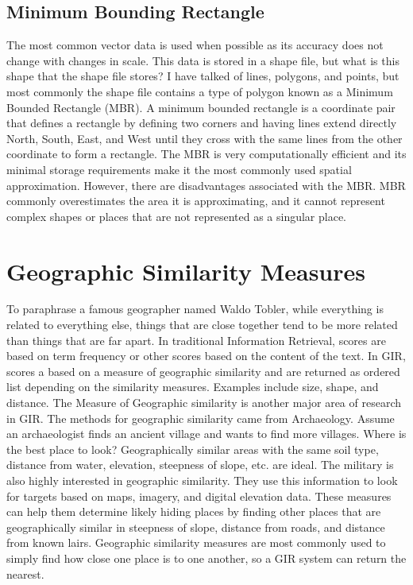 \documentclass[10pt, conference, compsocconf]{IEEEtran}
\begin{document}
\subsection{Minimum Bounding Rectangle}
The most common vector data is used when possible as its accuracy does not change with changes in scale. This data is stored in a shape file, but what is this shape that the shape file stores? I have talked of lines, polygons, and points, but most commonly the shape file contains a type of polygon known as a Minimum Bounded Rectangle (MBR). A minimum bounded rectangle is a coordinate pair that defines a rectangle by defining two corners and having lines extend directly North, South, East, and West until they cross with the same lines from the other coordinate to form a rectangle. The MBR is very computationally efficient and its minimal storage requirements make it the most commonly used spatial approximation. However, there are disadvantages associated with the MBR. MBR commonly overestimates the area it is approximating, and it cannot represent complex shapes or places that are not represented as a singular place. 
\section{Geographic Similarity Measures}
To paraphrase a famous geographer named Waldo Tobler, while everything is related to everything else, things that are close together tend to be more related than things that are far apart. In traditional Information Retrieval, scores are based on term frequency or other scores based on the content of the text. In GIR, scores a based on a measure of geographic similarity and are returned as ordered list depending on the similarity measures. Examples include size, shape, and distance. The Measure of Geographic similarity is another major area of research in GIR. The methods for geographic similarity came from Archaeology. Assume an archaeologist finds an ancient village and wants to find more villages. Where is the best place to look? Geographically similar areas with the same soil type, distance from water, elevation, steepness of slope, etc. are ideal. The military is also highly interested in geographic similarity. They use this information to look for targets based on maps, imagery, and digital elevation data. These measures can help them determine likely hiding places by finding other places that are geographically similar in steepness of slope, distance from roads, and distance from known lairs. Geographic similarity measures are most commonly used to simply find how close one place is to one another, so a GIR system can return the nearest.
\end{document}
